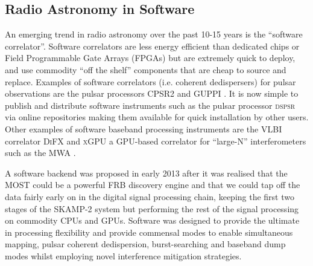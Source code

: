 \subsection{Radio Astronomy in Software}
An emerging trend in radio astronomy over the past 10-15 years is the ``software correlator''. Software correlators are less energy efficient than dedicated chips or Field Programmable Gate Arrays (FPGAs) but are extremely quick to deploy, and use commodity ``off the shelf'' components that are cheap to source and replace. Examples of software correlators (i.e. coherent dedispersers) for pulsar observations are the pulsar processors CPSR2 \citep{Bailes_2009} and GUPPI \citep{DuPlain_2008}. It is now simple to publish and distribute software instruments such as the pulsar processor \textsc{dspsr} \citep{van_Straten_2011} via online repositories making them available for quick installation by other users. Other examples of software baseband processing instruments are the VLBI correlator \textsc{DiFX} \citep{Deller_2007} 
 and \textsc{xGPU} \citep{Clark_2012} a GPU-based correlator for ``large-N'' interferometers such as the MWA \citep{Tingay_2013}. 

A software backend was proposed in early 2013 after it was realised that the MOST could be a powerful FRB discovery engine and that we could tap off the data fairly early on in the digital signal processing chain, keeping the first two stages of the SKAMP-2 system but performing the rest of the signal processing on commodity CPUs and GPUs. Software was designed to provide the ultimate in processing flexibility and provide commensal modes to enable simultaneous mapping, pulsar coherent dedispersion, burst-searching and baseband dump modes whilst employing novel interference mitigation strategies.
  